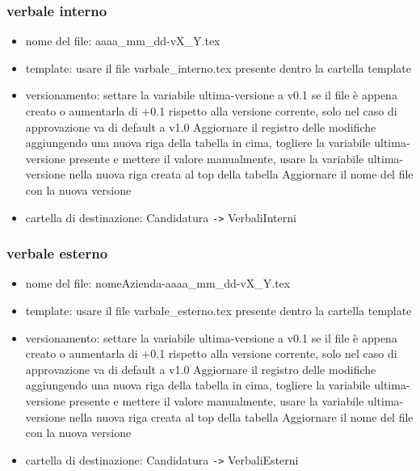 \documentclass[a4paper, 12pt]{article}
\begin{document}
    \subsubsection{verbale interno}
    \begin{itemize}
        \item nome del file: aaaa\_mm\_dd-vX\_Y.tex
        \item template: usare il file varbale\_interno.tex presente dentro la cartella template
        \item versionamento: settare la variabile ultima-versione a v0.1 se il file è appena creato o aumentarla di +0.1 rispetto alla versione corrente, solo nel caso di approvazione va di default a v1.0
        \newline Aggiornare il registro delle modifiche aggiungendo una nuova riga della tabella in cima, togliere la variabile ultima-versione presente e mettere il valore manualmente, usare la variabile ultima-versione nella nuova riga creata al top della tabella
        \newline Aggiornare il nome del file con la nuova versione
        \item cartella di destinazione: Candidatura \texttt{->} VerbaliInterni
    \end{itemize}
    \subsubsection{verbale esterno}
    \begin{itemize}
        \item nome del file: nomeAzienda-aaaa\_mm\_dd-vX\_Y.tex
        \item template: usare il file varbale\_esterno.tex presente dentro la cartella template
        \item versionamento: settare la variabile ultima-versione a v0.1 se il file è appena creato o aumentarla di +0.1 rispetto alla versione corrente, solo nel caso di approvazione va di default a v1.0
        \newline Aggiornare il registro delle modifiche aggiungendo una nuova riga della tabella in cima, togliere la variabile ultima-versione presente e mettere il valore manualmente, usare la variabile ultima-versione nella nuova riga creata al top della tabella
        \newline Aggiornare il nome del file con la nuova versione
        \item cartella di destinazione: Candidatura \texttt{->} VerbaliEsterni
    \end{itemize}
\end{document}
